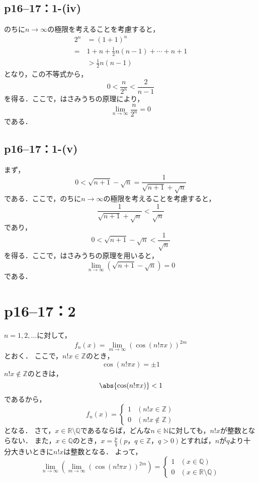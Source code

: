 \documentclass[a4paper,10pt,fleqn]{ltjsarticle}
\begin{document}
\subsection*{p16--17：1-(iv)}
\begin{tleftbar}
    のちに$n \to \infty$の極限を考えることを考慮すると，
    \begin{align*}
        2^n & = (1+1)^n                            \\
        =   & 1+n +\frac{1}{2} n(n-1)+ \cdots +n+1 \\
            & > \frac{1}{2} n(n-1)
    \end{align*}
    となり，この不等式から，
    \[
        0< \frac{n}{2^n} < \frac{2}{n-1}
    \]
    を得る．ここで，はさみうちの原理により，
    \[
        \lim_{n \to \infty} \frac{n}{2^n}=0
    \]
    である．
\end{tleftbar}

\subsection*{p16--17：1-(v)}
\begin{tleftbar}
    まず，
    \[
        0<\sqrt{n+1} - \sqrt{n} = \frac{1}{\sqrt{n+1} + \sqrt{n}}
    \]
    である．ここで，のちに$n \to \infty$の極限を考えることを考慮すると，
    \[
        \frac{1}{\sqrt{n+1} + \sqrt{n}} < \frac{1}{\sqrt{n}}
    \]
    であり，
    \[
        0< \sqrt{n+1} - \sqrt{n} <\frac{1}{\sqrt{n}}
    \]
    を得る．ここで，はさみうちの原理を用いると，
    \[
        \lim_{n \to \infty} (\sqrt{n+1} - \sqrt{n} )=0
    \]
    である．
\end{tleftbar}

\section*{p16--17：2}

$n=1,2,\ldots$に対して，
\[
    f_{n} (x)=\lim_{m \to \infty} (\cos (n! \pi x)) ^{2m}
\]
とおく．
ここで，$n!x \in \mathbb{Z}$のとき，
\[
    \cos (n! \pi x)=\pm 1
\]
$n!x \notin \mathbb{Z}$のときは，
\[
    \abs{\cos (n! \pi x)}<1
\]
であるから，
\[
    f_{n} (x)=
    \begin{cases}
        1 & (n!x \in \mathbb{Z})    \\
        0 & (n!x \notin \mathbb{Z})
    \end{cases}
\]
となる．
さて，$x \in \mathbb{R} \setminus \mathbb{Q}$であるならば，どんな$n \in \mathbb{N}$に対しても，$n! x$が整数とならない．
また，$x \in \mathbb{Q}$のとき，$ x=\frac{p}{q}(p，q \in \mathbb{Z}，q>0)$とすれば，$n$が$q$より十分大きいときに$n!x$は整数となる．
よって，
\[
    \lim_{n \to \infty} \left( \lim_{m \to \infty} (\cos (n! \pi x)) ^{2m} \right)=
    \begin{cases}
        1 & (x \in \mathbb{Q})                      \\
        0 & (x \in \mathbb{R} \setminus \mathbb{Q})
    \end{cases}
\]
\end{document}
